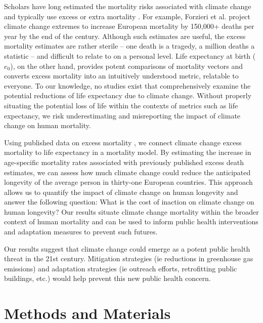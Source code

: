 \documentclass[12pt]{article}
\begin{document}
Scholars have long estimated the mortality risks associated with climate
change and typically use excess or extra mortality
\citep{forzieri2017increasing, wilson2017climate, mcmichael2006climate, zanobetti2012summer}.
For example, Forzieri et al. \citeyearpar{forzieri2017increasing}
project climate change extremes to increase European mortality by
150,000+ deaths per year by the end of the century. Although such
estimates are useful, the excess mortality estimates are rather sterile
-- one death is a tragedy, a million deaths a statistic -- and difficult
to relate to on a personal level. Life expectancy at birth (\(e_0\)), on
the other hand, provides potent comparisons of mortality vectors and
converts excess mortality into an intuitively understood metric,
relatable to everyone. To our knowledge, no studies exist that
comprehensively examine the potential reductions of life expectancy due
to climate change. Without properly situating the potential loss of life
within the contexts of metrics such as life expectancy, we risk
underestimating and misreporting the impact of climate change on human
mortality.

Using published data on excess mortality \citep{forzieri2017increasing},
we connect climate change excess mortality to life expectancy in a
mortality model. By estimating the increase in age-specific mortality
rates associated with previously published excess death estimates, we
can assess how much climate change could reduce the anticipated
longevity of the average person in thirty-one European countries. This
approach allows us to quantify the impact of climate change on human
longevity and answer the following question: What is the cost of
inaction on climate change on human longevity? Our results situate
climate change mortality within the broader context of human mortality
and can be used to inform public health interventions and adaptation
measures to prevent such futures.

Our results suggest that climate change could emerge as a potent public
health threat in the 21st century. Mitigation strategies (ie reductions
in greenhouse gas emissions) and adaptation strategies (ie outreach
efforts, retrofitting public buildings, etc.) would help prevent this
new public health concern.

\section{Methods and Materials}\label{methods-and-materials}
\end{document}
